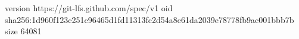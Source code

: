 version https://git-lfs.github.com/spec/v1
oid sha256:1d960f123c251c96465d1fd11313fc2d54a8e61da2039e78778fb9ac001bbb7b
size 64081
